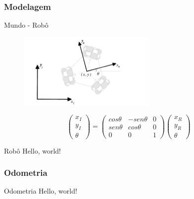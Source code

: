 \documentclass{beamer}
\begin{document}
\subsubsection{Modelagem}
\begin{frame}{Mundo - Robô}
  \begin{figure}[h]
    \centering
    \includegraphics[width = 0.6\textwidth]{imagens/ref}
  \end{figure}

  \begin{equation}
    \begin{pmatrix}
      x_I \\
      y_I \\
      \theta
    \end{pmatrix}
    =
    \begin{pmatrix}
      cos \theta & -sen \theta & 0 \\
      sen\theta  &  cos \theta & 0 \\
      0          & 0          & 1
    \end{pmatrix}
    \begin{pmatrix}
      x_R \\
      y_R \\
      \theta
    \end{pmatrix}
    \label{eq:world_ref}
  \end{equation}

\end{frame}

\begin{frame}{Robô}
  Hello, world!
\end{frame}
\subsubsection{Odometria}
\begin{frame}{Odometria}
  Hello, world!
\end{frame}
\end{document}

